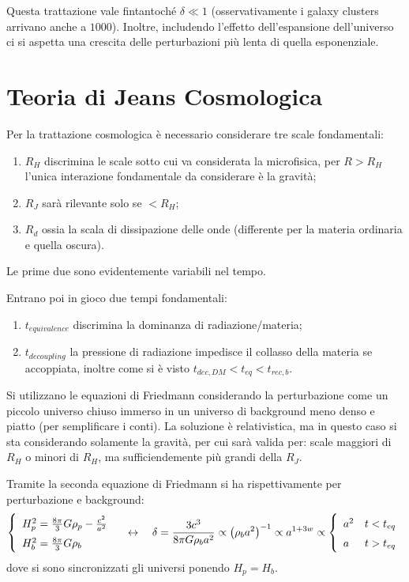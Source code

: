 \vspace{1em}
\noindent Questa trattazione vale fintantoché $\delta \ll 1$ (osservativamente i galaxy clusters arrivano anche a $1000$). Inoltre, includendo l'effetto dell'espansione dell'universo ci si aspetta una crescita delle perturbazioni più lenta di quella esponenziale.



\section{Teoria di Jeans Cosmologica}
Per la trattazione cosmologica è necessario considerare tre scale fondamentali:
\begin{enumerate}
    \item $R_H$ discrimina le scale sotto cui va considerata la microfisica, per $R>R_H$ l'unica interazione fondamentale da considerare è la gravità;
    \item $R_J$ sarà rilevante solo se $<R_H$;
    \item $R_d$ ossia la scala di dissipazione delle onde (differente per la materia ordinaria e quella oscura).
\end{enumerate}
Le prime due sono evidentemente variabili nel tempo.

Entrano poi in gioco due tempi fondamentali:
\begin{enumerate}
    \item $t_{equivalence}$ discrimina la dominanza di radiazione/materia;
    \item $t_{decoupling}$ la pressione di radiazione impedisce il collasso della materia se accoppiata, inoltre come si è visto $t_{dec,DM} < t_{eq} < t_{rec,b}$.
\end{enumerate}

Si utilizzano le equazioni di Friedmann considerando la perturbazione come un piccolo universo chiuso immerso in un universo di background meno denso e piatto (per semplificare i conti). La soluzione è relativistica, ma in questo caso si sta considerando solamente la gravità, per cui sarà valida per: scale maggiori di $R_H$ o minori di $R_H$, ma sufficiendemente più grandi della $R_J$. 

Tramite la seconda equazione di Friedmann si ha rispettivamente per perturbazione e background:
\begin{equation}\left\{
    \def\arraystretch{1.5}
        \begin{array}{l}
            H_p^2=\frac{8\pi }{3}G \rho_p - \frac{c^2}{a^2}\\
            H_b^2 =\frac{8\pi}{3}G \rho_b
    \end{array}\right. \quad\leftrightarrow\quad \delta = \frac{3c^3}{8\pi G \rho_b a^2}\propto \left(\rho_b a^2\right)^{-1}\propto a^{1+3w}\propto
    \left\{
   \begin{array}{ll}
        a^2 & t<t_{eq}\\
        a & t>t_{eq}
\end{array}\right. 
\end{equation}
dove si sono sincronizzati gli universi ponendo $H_p=H_b$.

